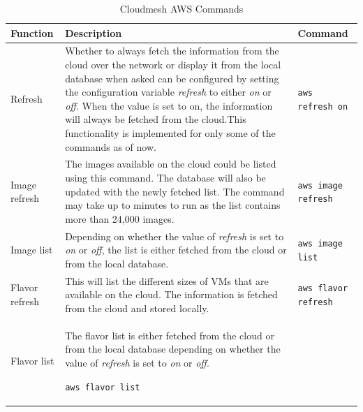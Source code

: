 \documentclass[9pt,twocolumn,twoside]{../../styles/osajnl}
\begin{document}
\begin{table}[p]
\caption{Cloudmesh AWS Commands}\label{T:aws-commands} 
\begin{center}
\begin{tabular}{p{2cm}p{10cm}p{5cm}}
  Function & Description & Command \\
  \hline
  Refresh &
            Whether to always fetch the information from the cloud
            over the network or display it from the local database when asked
            can be configured by setting the configuration variable {\it refresh} to
            either {\it on} or {\it off}. When the value is set to on, the information
            will always be fetched from the cloud.This functionality is
            implemented for only some of the commands as of now.
                         & \verb+aws refresh on+ \\
  \hline
  Image refresh&
                 The images available on the cloud could be listed
                 using this command. The database will also be updated with the newly
                 fetched list. The command may take up to minutes to run as the list
                 contains more than 24,000 images. 
    & \verb+aws image refresh+ \\
\hline
Image list & Depending on whether the value of {\it refresh} is
      set to {\it on} or {\it off}, the list is either fetched from the
      cloud or from the local database. &
    \verb+aws image list+\\
\hline	
Flavor refresh & This will list the different sizes of VMs
                   that are available on the cloud. The information is fetched from
                   the cloud and stored locally. & 
                                                   \verb+aws flavor refresh+ \\ 
\hline
Flavor list & The flavor list is either fetched from the
      cloud or from the local database depending on whether the
      value of {\it refresh} is set to {\it on} or {\it off}.
	
    \verb+aws flavor list+ \\
	

\end{tabular}
\end{center}
\end{table}
\end{document}
